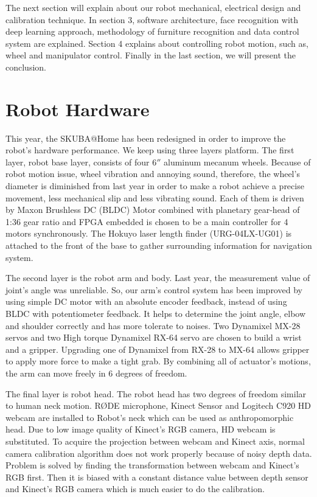 \documentclass{llncs}
\begin{document}
The next section will explain about our robot mechanical, electrical design and calibration technique. In section 3, software architecture, face recognition with deep learning approach, methodology of furniture recognition and data control system are explained. Section 4 explains about controlling robot motion, such as, wheel and manipulator control. Finally in the last section, we will present the conclusion.

\section{Robot Hardware}

This year, the SKUBA@Home has been redesigned in order to improve the robot's hardware performance. We keep using three layers platform. The first layer, robot base layer, consists of four 6$''$ aluminum mecanum wheels. Because of robot motion issue, wheel vibration and annoying sound, therefore, the wheel's diameter is diminished from last year in order to make a robot achieve a precise movement, less mechanical slip and less vibrating sound. Each of them is driven by Maxon Brushless DC (BLDC) Motor combined with planetary gear-head of 1:36 gear ratio and FPGA embedded is chosen to be a main controller for 4 motors synchronously. The Hokuyo laser length finder (URG-04LX-UG01) is attached to the front of the base to gather surrounding information for navigation system.

The second layer is the robot arm and body. Last year, the measurement value of joint's angle was unreliable.  So, our arm's control system has been improved by using simple DC motor with an absolute encoder feedback, instead of using BLDC with potentiometer feedback. It helps to determine the joint angle, elbow and shoulder correctly and has more tolerate to noises. Two Dynamixel MX-28 servos and two High torque Dynamixel RX-64 servo are chosen to build a wrist and a gripper. Upgrading one of Dynamixel from RX-28 to MX-64 allows gripper to apply more force to make a tight grab. By combining all of actuator's motions, the arm can move freely in 6 degrees of freedom.

The final layer is robot head. The robot head has two degrees of freedom similar to human neck motion. R\O DE microphone, Kinect Sensor and Logitech C920 HD webcam are installed to Robot’s neck which can be used as anthropomorphic head. Due to low image quality of Kinect's RGB camera, HD webcam is substituted. To acquire the projection between webcam and Kinect axis, normal camera calibration algorithm does not work properly because of noisy depth data. Problem is solved by finding the transformation between webcam and Kinect's RGB first. Then it is biased with a constant distance value between depth sensor and Kinect's RGB camera which is much easier to do the calibration.
\end{document}
